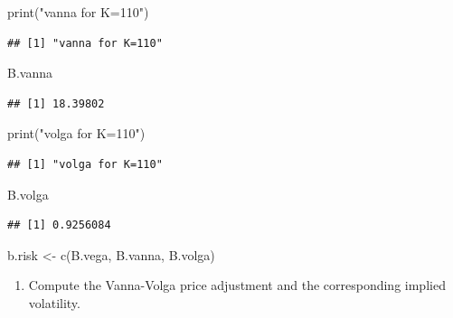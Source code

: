 \documentclass[
]{article}
\newenvironment{Shaded}{\begin{snugshade}}{\end{snugshade}}
\newcommand{\FunctionTok}[1]{\textcolor[rgb]{0.00,0.00,0.00}{#1}}
\newcommand{\NormalTok}[1]{#1}
\newcommand{\OtherTok}[1]{\textcolor[rgb]{0.56,0.35,0.01}{#1}}
\newcommand{\StringTok}[1]{\textcolor[rgb]{0.31,0.60,0.02}{#1}}
\providecommand{\tightlist}{%
  \setlength{\itemsep}{0pt}\setlength{\parskip}{0pt}}
\begin{document}
\begin{Shaded}
\begin{Highlighting}[]
\FunctionTok{print}\NormalTok{(}\StringTok{"vanna for K=110"}\NormalTok{)}
\end{Highlighting}
\end{Shaded}

\begin{verbatim}
## [1] "vanna for K=110"
\end{verbatim}

\begin{Shaded}
\begin{Highlighting}[]
\NormalTok{B.vanna}
\end{Highlighting}
\end{Shaded}

\begin{verbatim}
## [1] 18.39802
\end{verbatim}

\begin{Shaded}
\begin{Highlighting}[]
\FunctionTok{print}\NormalTok{(}\StringTok{"volga for K=110"}\NormalTok{)}
\end{Highlighting}
\end{Shaded}

\begin{verbatim}
## [1] "volga for K=110"
\end{verbatim}

\begin{Shaded}
\begin{Highlighting}[]
\NormalTok{B.volga}
\end{Highlighting}
\end{Shaded}

\begin{verbatim}
## [1] 0.9256084
\end{verbatim}

\begin{Shaded}
\begin{Highlighting}[]
\NormalTok{b.risk }\OtherTok{\textless{}{-}} \FunctionTok{c}\NormalTok{(B.vega, B.vanna, B.volga)}
\end{Highlighting}
\end{Shaded}

\begin{enumerate}
\def\labelenumi{\arabic{enumi}.}
\setcounter{enumi}{4}
\tightlist
\item
  Compute the Vanna-Volga price adjustment and the corresponding implied
  volatility.
\end{enumerate}
\end{document}
